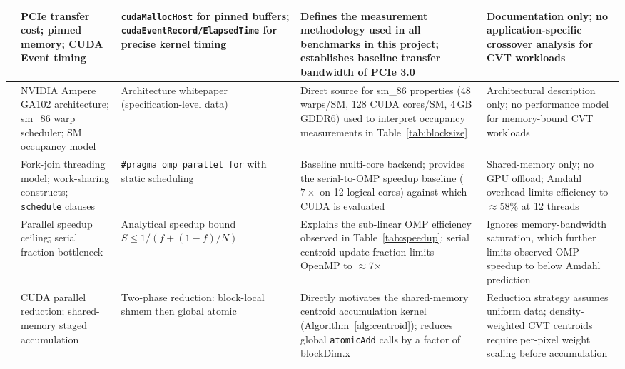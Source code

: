 \documentclass[12pt,a4paper]{article}
\begin{document}
\begin{longtable}{|p{2.5cm}|p{3.0cm}|p{3.0cm}|p{3.3cm}|p{3.3cm}|}
\cite{nvidia2023cuda} &
PCIe transfer cost; pinned memory; CUDA Event timing &
\texttt{cudaMallocHost} for pinned buffers;
\texttt{cudaEventRecord/ElapsedTime} for precise kernel timing &
Defines the measurement methodology used in all benchmarks in
this project; establishes baseline transfer bandwidth of PCIe 3.0 &
Documentation only; no application-specific crossover analysis for
CVT workloads \\
\hline

\cite{nvidia2020ampere} &
NVIDIA Ampere GA102 architecture; sm\_86 warp scheduler; SM occupancy model &
Architecture whitepaper (specification-level data) &
Direct source for sm\_86 properties (48 warps/SM, 128 CUDA cores/SM, 4\,GB GDDR6)
used to interpret occupancy measurements in Table~\ref{tab:blocksize} &
Architectural description only; no performance model for
memory-bound CVT workloads \\
\hline

\cite{openmp2021} &
Fork-join threading model; work-sharing constructs; \texttt{schedule} clauses &
\texttt{\#pragma omp parallel for} with static scheduling &
Baseline multi-core backend; provides the serial-to-OMP speedup baseline
($7\times$ on 12 logical cores) against which CUDA is evaluated &
Shared-memory only; no GPU offload; Amdahl overhead limits efficiency
to $\approx$58\% at 12 threads \\
\hline

\cite{amdahl1967validity} &
Parallel speedup ceiling; serial fraction bottleneck &
Analytical speedup bound $S \leq 1/(f + (1-f)/N)$ &
Explains the sub-linear OMP efficiency observed in Table~\ref{tab:speedup};
serial centroid-update fraction limits OpenMP to $\approx$7$\times$ &
Ignores memory-bandwidth saturation, which further limits
observed OMP speedup to below Amdahl prediction \\
\hline

\cite{harris2007optimizing} &
CUDA parallel reduction; shared-memory staged accumulation &
Two-phase reduction: block-local shmem then global atomic &
Directly motivates the shared-memory centroid accumulation kernel
(Algorithm~\ref{alg:centroid}); reduces global \texttt{atomicAdd} calls
by a factor of blockDim.x &
Reduction strategy assumes uniform data; density-weighted CVT
centroids require per-pixel weight scaling before accumulation \\
\hline
\end{longtable}


\end{document}
